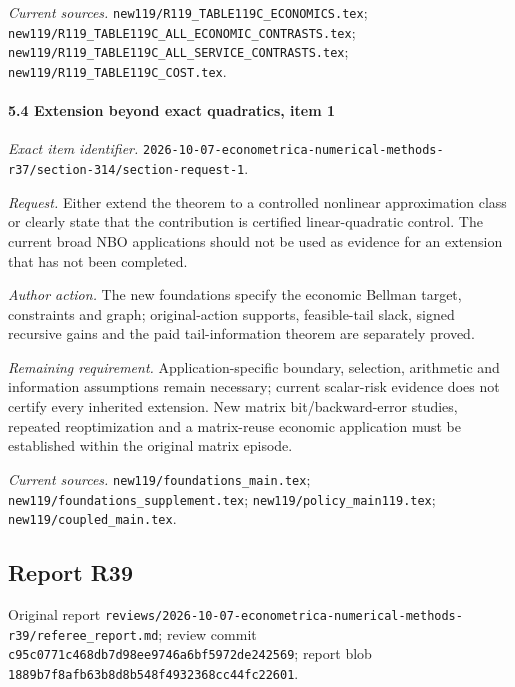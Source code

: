 \par\emph{Current sources.} \nolinkurl{new119/R119_TABLE119C_ECONOMICS.tex}; \nolinkurl{new119/R119_TABLE119C_ALL_ECONOMIC_CONTRASTS.tex}; \nolinkurl{new119/R119_TABLE119C_ALL_SERVICE_CONTRASTS.tex}; \nolinkurl{new119/R119_TABLE119C_COST.tex}.

\paragraph{5.4 Extension beyond exact quadratics, item 1}

\emph{Exact item identifier.} \nolinkurl{2026-10-07-econometrica-numerical-methods-r37/section-314/section-request-1}.

\par\emph{Request.} Either extend the theorem to a controlled nonlinear approximation class or clearly state that the contribution is certified linear-quadratic control. The current broad NBO applications should not be used as evidence for an extension that has not been completed.

\par\emph{Author action.} The new foundations specify the economic Bellman target, constraints and graph; original-action supports, feasible-tail slack, signed recursive gains and the paid tail-information theorem are separately proved.

\par\emph{Remaining requirement.} Application-specific boundary, selection, arithmetic and information assumptions remain necessary; current scalar-risk evidence does not certify every inherited extension. New matrix bit/\allowbreak{}backward-error studies, repeated reoptimization and a matrix-reuse economic application must be established within the original matrix episode.

\par\emph{Current sources.} \nolinkurl{new119/foundations_main.tex}; \nolinkurl{new119/foundations_supplement.tex}; \nolinkurl{new119/policy_main119.tex}; \nolinkurl{new119/coupled_main.tex}.

\subsection{Report R39}

Original report \nolinkurl{reviews/2026-10-07-econometrica-numerical-methods-r39/referee_report.md}; review commit \nolinkurl{c95c0771c468db7d98ee9746a6bf5972de242569}; report blob \nolinkurl{1889b7f8afb63b8d8b548f4932368cc44fc22601}.


